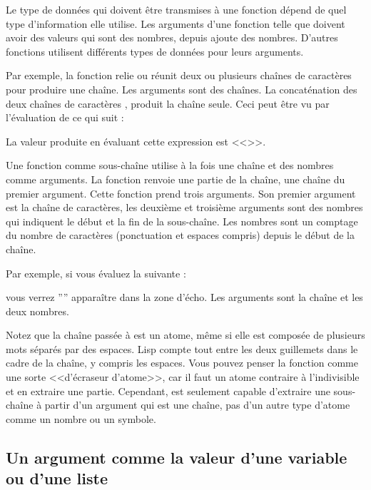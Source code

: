 Le type de données qui doivent être transmises à une fonction dépend
de quel type d'information elle utilise. Les arguments d'une fonction
telle que \tm{+} doivent avoir des valeurs qui sont des nombres,
depuis \tm{+} ajoute des nombres. D'autres fonctions utilisent
différents types de données pour leurs arguments.

Par exemple, la fonction  relie ou réunit deux ou plusieurs
chaînes de caractères pour produire une chaîne. Les arguments sont des
chaînes. La concaténation des deux chaînes de caractères ,
 produit la chaîne  seule. Ceci peut être vu par
l'évaluation de ce qui suit : 
\begin{center}
\end{center}

La valeur produite en évaluant cette expression est <<>>.

Une fonction comme sous-chaîne utilise à la fois une chaîne et des
nombres comme arguments. La fonction renvoie une partie de la chaîne,
une chaîne du premier argument. Cette fonction prend trois
arguments. Son premier argument est la chaîne de caractères, les
deuxième et troisième arguments sont des nombres qui indiquent le
début et la fin de la sous-chaîne. Les nombres sont un comptage du
nombre de caractères (ponctuation et espaces compris) depuis le début
de la chaîne.

Par exemple, si vous évaluez la suivante :
\begin{center}
\end{center}

vous verrez '''' apparaître dans la zone d'écho. Les arguments
sont la chaîne et les deux nombres. 

Notez que la chaîne passée à  est un atome, même si elle
est composée de plusieurs mots séparés par des espaces. Lisp compte
tout entre les deux guillemets dans le cadre de la chaîne, y compris
les espaces. Vous pouvez penser la fonction  comme une
sorte <<d'écraseur d'atome>>, car il faut un atome contraire à
l'indivisible et en extraire une partie. Cependant,  est
seulement capable d'extraire une sous-chaîne à partir d'un argument
qui est une chaîne, pas d'un autre type d'atome comme un nombre ou un
symbole.



\subsection{Un argument comme la valeur d'une variable ou d'une
  liste}


